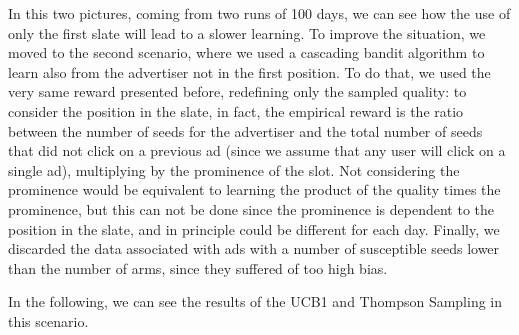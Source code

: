 \documentclass{article}
\begin{document}
In this two pictures, coming from two runs of 100 days, we can see how the use of only the first slate will lead to a slower learning. To improve the situation, we moved to the second scenario, where we used a cascading bandit algorithm to learn also from the advertiser not in the first position. To do that, we used the very same reward presented before, redefining only the sampled quality: to consider the position in the slate, in fact, the empirical reward is the ratio between the number of seeds for the advertiser and the total number of seeds that did not click on a previous ad (since we assume that any user will click on a single ad), multiplying by the prominence of the slot. Not considering the prominence would be equivalent to learning the product of the quality times the prominence, but this can not be done since the prominence is dependent to the position in the slate, and in principle could be different for each day. Finally, we discarded the data associated with ads with a number of susceptible seeds lower than the number of arms, since they suffered of too high bias.

In the following, we can see the results of the UCB1 and Thompson Sampling in this scenario.
\end{document}
